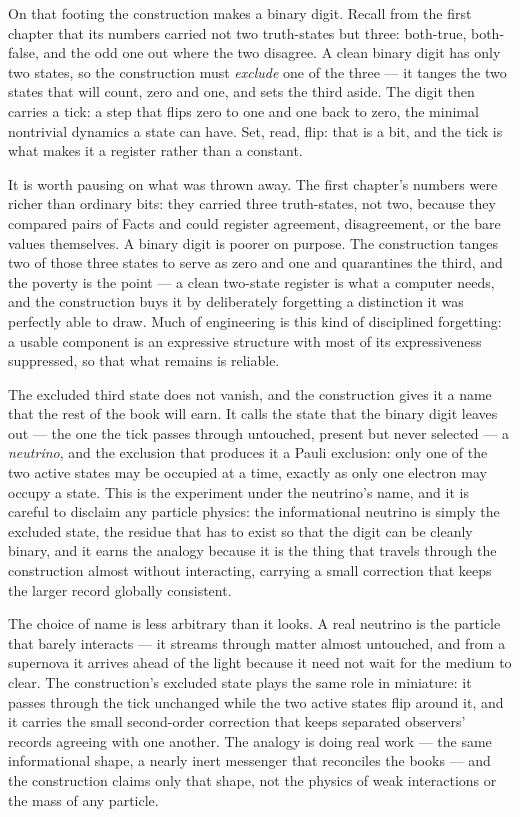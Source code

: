 On that footing the construction makes a binary digit. Recall from the first chapter that its numbers
carried not two truth-states but three: both-true, both-false, and the odd one out where the two
disagree. A clean binary digit has only two states, so the construction must \emph{exclude} one of the
three --- it tanges the two states that will count, zero and one, and sets the third aside. The digit
then carries a tick: a step that flips zero to one and one back to zero, the minimal nontrivial
dynamics a state can have. Set, read, flip: that is a bit, and the tick is what makes it a register
rather than a constant.

It is worth pausing on what was thrown away. The first chapter's numbers were richer than ordinary
bits: they carried three truth-states, not two, because they compared pairs of Facts and could register
agreement, disagreement, or the bare values themselves. A binary digit is poorer on purpose. The
construction tanges two of those three states to serve as zero and one and quarantines the third, and
the poverty is the point --- a clean two-state register is what a computer needs, and the construction
buys it by deliberately forgetting a distinction it was perfectly able to draw. Much of engineering is
this kind of disciplined forgetting: a usable component is an expressive structure with most of its
expressiveness suppressed, so that what remains is reliable.

The excluded third state does not vanish, and the construction gives it a name that the rest of the
book will earn. It calls the state that the binary digit leaves out --- the one the tick passes through
untouched, present but never selected --- a \emph{neutrino}, and the exclusion that produces it a
Pauli exclusion: only one of the two active states may be occupied at a time, exactly as only one
electron may occupy a state. This is the experiment under the neutrino's name, and it is careful to
disclaim any particle physics: the informational neutrino is simply the excluded state, the residue
that has to exist so that the digit can be cleanly binary, and it earns the analogy because it is the
thing that travels through the construction almost without interacting, carrying a small correction
that keeps the larger record globally consistent.

The choice of name is less arbitrary than it looks. A real neutrino is the particle that barely
interacts --- it streams through matter almost untouched, and from a supernova it arrives ahead of the
light because it need not wait for the medium to clear. The construction's excluded state plays the same
role in miniature: it passes through the tick unchanged while the two active states flip around it, and
it carries the small second-order correction that keeps separated observers' records agreeing with one
another. The analogy is doing real work --- the same informational shape, a nearly inert messenger that
reconciles the books --- and the construction claims only that shape, not the physics of weak
interactions or the mass of any particle.


